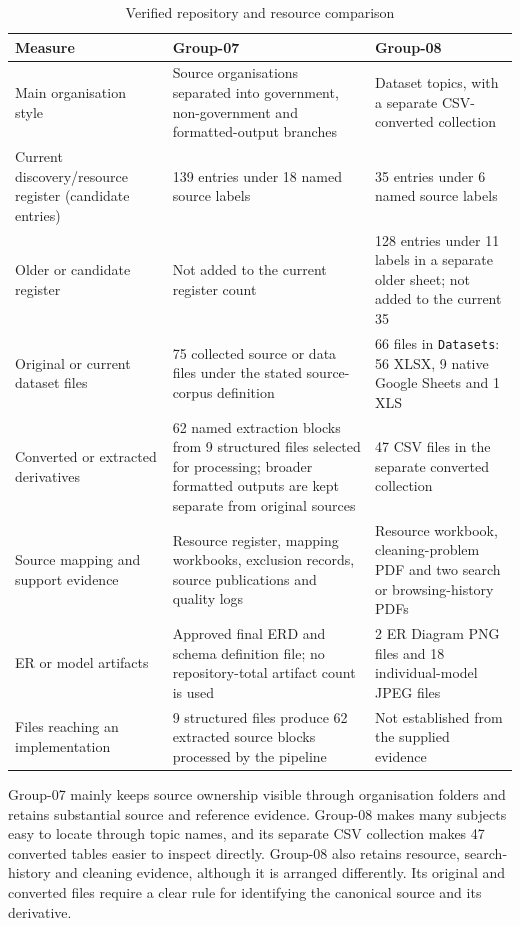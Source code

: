 \begin{table}[H]
\centering
\caption{Verified repository and resource comparison}
\label{tab:verified-repository-comparison}
\small
\begin{tabular}{L{0.24\textwidth}L{0.34\textwidth}L{0.34\textwidth}}
\toprule
Measure & Group-07 & Group-08 \\
\midrule
Main organisation style & Source organisations separated into government,
non-government and formatted-output branches & Dataset topics, with a separate
CSV-converted collection \\
Current discovery/resource register (candidate entries) & 139 entries under 18
named source labels & 35 entries under 6 named source labels \\
Older or candidate register & Not added to the current register count & 128
entries under 11 labels in a separate older sheet; not added to the current 35
\\
Original or current dataset files & 75 collected source or data files under the
stated source-corpus definition & 66 files in \texttt{Datasets}: 56 XLSX, 9
native Google Sheets and 1 XLS \\
Converted or extracted derivatives & 62 named extraction blocks from 9
structured files selected for processing; broader formatted outputs are kept
separate from original sources & 47 CSV files in the separate converted
collection \\
Source mapping and support evidence & Resource register, mapping workbooks,
exclusion records, source publications and quality logs & Resource workbook,
cleaning-problem PDF and two search or browsing-history PDFs \\
ER or model artifacts & Approved final ERD and schema definition file; no
repository-total artifact count is used & 2 ER Diagram PNG files and 18
individual-model JPEG files \\
Files reaching an implementation & 9 structured files produce 62 extracted
source blocks processed by the pipeline & Not established from the supplied
evidence \\
\bottomrule
\end{tabular}
\end{table}

Group-07 mainly keeps source ownership visible through organisation folders and
retains substantial source and reference evidence. Group-08 makes many subjects
easy to locate through topic names, and its separate CSV collection makes 47
converted tables easier to inspect directly. Group-08 also retains resource,
search-history and cleaning evidence, although it is arranged differently. Its
original and converted files require a clear rule for identifying the canonical
source and its derivative.

